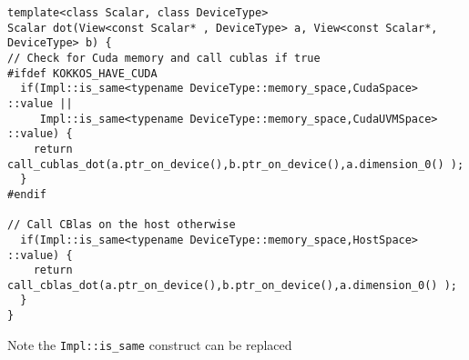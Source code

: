 \begin{lstlisting}
template<class Scalar, class DeviceType>
Scalar dot(View<const Scalar* , DeviceType> a, View<const Scalar*, DeviceType> b) {
// Check for Cuda memory and call cublas if true
#ifdef KOKKOS_HAVE_CUDA
  if(Impl::is_same<typename DeviceType::memory_space,CudaSpace> ::value ||
     Impl::is_same<typename DeviceType::memory_space,CudaUVMSpace> ::value) {
    return call_cublas_dot(a.ptr_on_device(),b.ptr_on_device(),a.dimension_0() );
  }
#endif

// Call CBlas on the host otherwise
  if(Impl::is_same<typename DeviceType::memory_space,HostSpace> ::value) {
    return call_cblas_dot(a.ptr_on_device(),b.ptr_on_device(),a.dimension_0() );
  }
}
\end{lstlisting}

Note the \lstinline|Impl::is_same| construct can be replaced
